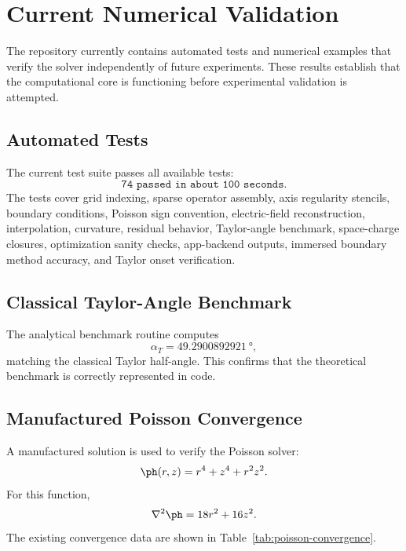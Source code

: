 \section{Current Numerical Validation}

The repository currently contains automated tests and numerical examples that verify the solver independently of future experiments. These results establish that the computational core is functioning before experimental validation is attempted.

\subsection{Automated Tests}

The current test suite passes all available tests:
\begin{equation*}
\texttt{74 passed in about 100 seconds}.
\end{equation*}
The tests cover grid indexing, sparse operator assembly, axis regularity stencils, boundary conditions, Poisson sign convention, electric-field reconstruction, interpolation, curvature, residual behavior, Taylor-angle benchmark, space-charge closures, optimization sanity checks, app-backend outputs, immersed boundary method accuracy, and Taylor onset verification.

\subsection{Classical Taylor-Angle Benchmark}

The analytical benchmark routine computes
\begin{equation*}
\alpha_T = \SI{49.2900892921}{\degree},
\end{equation*}
matching the classical Taylor half-angle. This confirms that the theoretical benchmark is correctly represented in code.

\subsection{Manufactured Poisson Convergence}

A manufactured solution is used to verify the Poisson solver:
\begin{equation}
\ph(r,z)=r^4+z^4+r^2z^2.
\end{equation}
For this function,
\begin{equation}
\nabla^2\ph=18r^2+16z^2.
\end{equation}
The existing convergence data are shown in Table~\ref{tab:poisson-convergence}.

